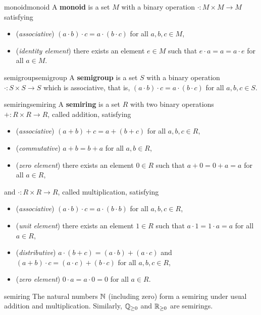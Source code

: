 \begin{topic}{monoid}{monoid}
    A \textbf{monoid} is a set $M$ with a binary operation $\cdot : M \times M \to M$ satisfying
    \begin{itemize}
        \item (\textit{associative}) $(a \cdot b) \cdot c = a \cdot (b \cdot c)$ for all $a, b, c \in M$,
        \item (\textit{identity element}) there exists an element $e \in M$ such that $e \cdot a = a = a \cdot e$ for all $a \in M$.
    \end{itemize}
\end{topic}

\begin{topic}{semigroup}{semigroup}
    A \textbf{semigroup} is a set $S$ with a binary operation $\cdot : S \times S \to S$ which is associative, that is, $(a \cdot b) \cdot c = a \cdot (b \cdot c)$ for all $a, b, c \in S$.
\end{topic}

\begin{topic}{semiring}{semiring}
    A \textbf{semiring} is a set $R$ with two binary operations $+ : R \times R \to R$, called addition, satisfying
    \begin{itemize}
        \item (\textit{associative}) $(a + b) + c = a + (b + c)$ for all $a, b, c \in R$,
        \item (\textit{commutative}) $a + b = b + a$ for all $a, b \in R$,
        \item (\textit{zero element}) there exists an element $0 \in R$ such that $a + 0 = 0 + a = a$ for all $a \in R$,
    \end{itemize}
    and $\cdot : R \times R \to R$, called multiplication, satisfying
    \begin{itemize}
        \item (\textit{associative}) $(a \cdot b) \cdot c = a \cdot (b \cdot b)$ for all $a, b, c \in R$,
        \item (\textit{unit element}) there exists an element $1 \in R$ such that $a \cdot 1 = 1 \cdot a = a$ for all $a \in R$,
        \item (\textit{distributive}) $a \cdot (b + c) = (a \cdot b) + (a \cdot c)$ and $(a + b) \cdot c = (a \cdot c) + (b \cdot c)$ for all $a, b, c \in R$,
        \item (\textit{zero element}) $0 \cdot a = a \cdot 0 = 0$ for all $a \in R$.
    \end{itemize}
\end{topic}

\begin{example}{semiring}
    The natural numbers $\mathbb{N}$ (including zero) form a semiring under usual addition and multiplication. Similarly, $\mathbb{Q}_{\ge 0}$ and $\mathbb{R}_{\ge 0}$ are semirings.
\end{example}
